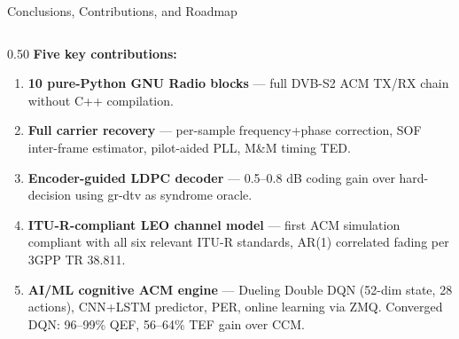 \documentclass[aspectratio=169,10pt]{beamer}
\begin{document}
\begin{frame}[shrink=12]{Conclusions, Contributions, and Roadmap}
  \begin{columns}[T]
    \begin{column}{0.50\textwidth}
      \textbf{Five key contributions:}
      \begin{enumerate}\scriptsize
        \item \textbf{10 pure-Python GNU Radio blocks} — full DVB-S2 ACM TX/RX chain without C++ compilation.

        \item \textbf{Full carrier recovery} — per-sample frequency+phase correction, SOF inter-frame estimator, pilot-aided PLL, M\&M timing TED.

        \item \textbf{Encoder-guided LDPC decoder} — 0.5--0.8 dB coding gain over hard-decision using gr-dtv as syndrome oracle.

        \item \textbf{ITU-R-compliant LEO channel model} — first ACM simulation compliant with all six relevant ITU-R standards, AR(1) correlated fading per 3GPP TR 38.811.

        \item \textbf{AI/ML cognitive ACM engine} — Dueling Double DQN (52-dim state, 28 actions), CNN+LSTM predictor, PER, online learning via ZMQ. Converged DQN: 96--99\% QEF, 56--64\% TEF gain over CCM.
      \end{enumerate}


\end{column}
\end{columns}
\end{frame}
\end{document}
